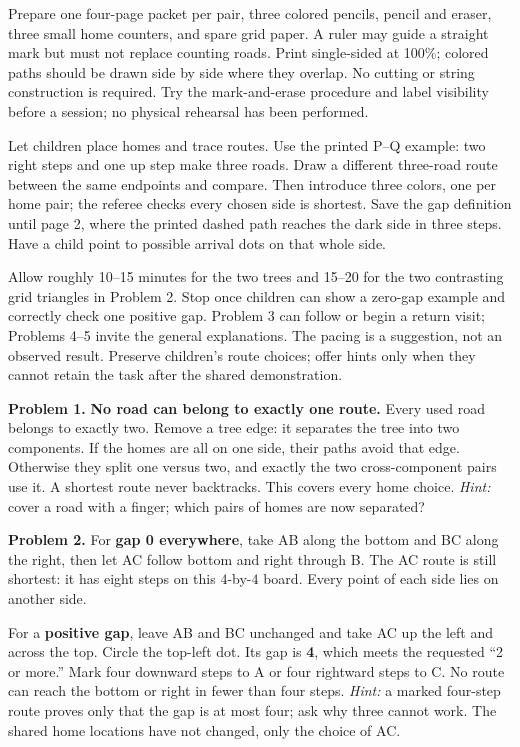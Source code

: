 \documentclass[11pt,letterpaper]{article}
\newcommand{\heading}[1]{\par\vspace{5pt}{\large\bfseries #1}\par}
\begin{document}
\heading{Materials and common launch}
Prepare one four-page packet per pair, three colored pencils, pencil and eraser, three small home counters, and spare grid paper. A ruler may guide a straight mark but must not replace counting roads. Print single-sided at 100\%; colored paths should be drawn side by side where they overlap. No cutting or string construction is required. Try the mark-and-erase procedure and label visibility before a session; no physical rehearsal has been performed.

Let children place homes and trace routes. Use the printed P--Q example: two right steps and one up step make three roads. Draw a different three-road route between the same endpoints and compare. Then introduce three colors, one per home pair; the referee checks every chosen side is shortest. Save the gap definition until page 2, where the printed dashed path reaches the dark side in three steps. Have a child point to possible arrival dots on that whole side.

\heading{A feasible first visit}
Allow roughly 10--15 minutes for the two trees and 15--20 for the two contrasting grid triangles in Problem 2. Stop once children can show a zero-gap example and correctly check one positive gap. Problem 3 can follow or begin a return visit; Problems 4--5 invite the general explanations. The pacing is a suggestion, not an observed result. Preserve children's route choices; offer hints only when they cannot retain the task after the shared demonstration.
\newpage
\heading{Numbered answers and proof prompts}
\textbf{Problem 1.} \textbf{No road can belong to exactly one route.} Every used road belongs to exactly two. Remove a tree edge: it separates the tree into two components. If the homes are all on one side, their paths avoid that edge. Otherwise they split one versus two, and exactly the two cross-component pairs use it. A shortest route never backtracks. This covers every home choice. \emph{Hint:} cover a road with a finger; which pairs of homes are now separated?

\textbf{Problem 2.} For \textbf{gap 0 everywhere}, take AB along the bottom and BC along the right, then let AC follow bottom and right through B. The AC route is still shortest: it has eight steps on this $4$-by-$4$ board. Every point of each side lies on another side.

For a \textbf{positive gap}, leave AB and BC unchanged and take AC up the left and across the top. Circle the top-left dot. Its gap is \textbf{4}, which meets the requested ``2 or more.'' Mark four downward steps to A or four rightward steps to C. No route can reach the bottom or right in fewer than four steps. \emph{Hint:} a marked four-step route proves only that the gap is at most four; ask why three cannot work. The shared home locations have not changed, only the choice of AC.
\end{document}
